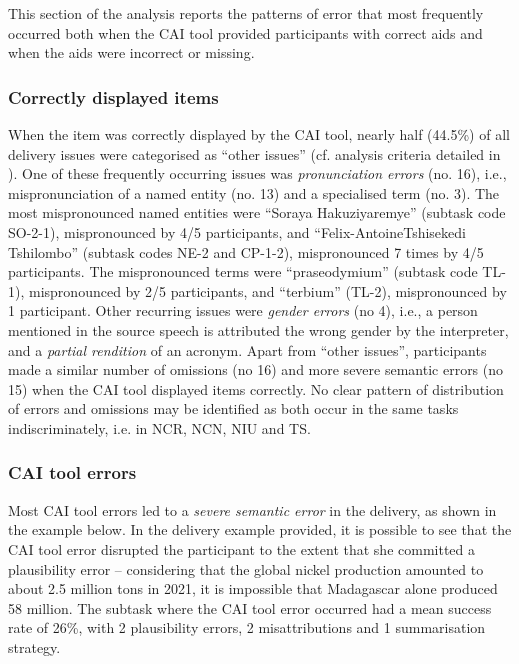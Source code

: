 This section of the analysis reports the patterns of error that most frequently occurred both when the CAI tool provided participants with correct aids and when the aids were incorrect or missing.



\subsubsection{Correctly displayed items}

When the item was correctly displayed by the CAI tool, nearly half (44.5\%) of all delivery issues were categorised as ``other issues'' (cf. analysis criteria detailed in ). One of these frequently occurring issues was \textit{pronunciation errors} (no. 16), i.e., mispronunciation of a named entity (no. 13) and a specialised term (no. 3). The most mispronounced named entities were “Soraya Hakuziyaremye” (subtask code SO-2-1), mispronounced by 4/5 participants, and “Felix-AntoineTshisekedi Tshilombo” (subtask codes NE-2 and CP-1-2), mispronounced 7 times by 4/5 participants. The mispronounced terms were ``praseodymium'' (subtask code TL-1), mispronounced by 2/5 participants, and ``terbium'' (TL-2), mispronounced by 1 participant. Other recurring issues were \textit{gender errors} (no 4), i.e., a person mentioned in the source speech is attributed the wrong gender by the interpreter, and a \textit{partial rendition} of an acronym. Apart from ``other issues'', participants made a similar number of omissions (no 16) and more severe semantic errors (no 15) when the CAI tool displayed items correctly. No clear pattern of distribution of errors and omissions may be identified as both occur in the same tasks indiscriminately, i.e. in NCR, NCN, NIU and TS.



\subsubsection{CAI tool errors}

Most CAI tool errors led to a \textit{severe semantic error} in the delivery, as shown in the example below. In the delivery example provided, it is possible to see that the CAI tool error disrupted the participant to the extent that she committed a plausibility error -- considering that the global nickel production amounted to about 2.5 million tons in 2021, it is impossible that Madagascar alone produced 58 million. The subtask where the CAI tool error occurred had a mean success rate of 26\%, with 2 plausibility errors, 2 misattributions and 1 summarisation strategy.

